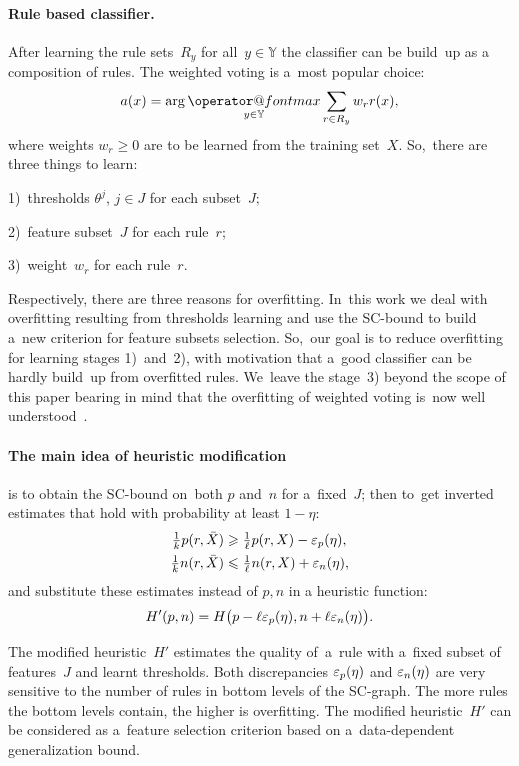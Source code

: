 \documentclass{article}
\makeatletter
\let\cite\citep
\def\YY{\mathbb{Y}}
\newcommand{\X}{\bar X}
\renewcommand{\geq}{\geqslant}
\renewcommand{\leq}{\leqslant}
\renewcommand{\max}{\mathop{\operator@font max}\limits}
\makeatother
\begin{document}
\paragraph{Rule based classifier.}
After learning the rule sets~$R_y$ for all~$y\in\YY$
the classifier can be build~up as a composition of rules.
The weighted voting is a~most popular choice:
\[
    a(x) = \arg\max_{y\in \YY} \sum_{r\in R_y} w_r r(x),
\]
where weights $w_r \geq 0$ are to be learned from the training set~$X$.
So,~there are three things to learn:

1)~thresholds $\theta^j$,\: $j\in J$  for each subset~$J$;\;

2)~feature subset~$J$  for each rule~$r$;\;

3)~weight~$w_r$  for each rule~$r$.

Respectively, there are three reasons for overfitting.
In~this work we deal with overfitting resulting from thresholds learning
and use the SC-bound to build a~new criterion for feature subsets selection.
So,~our goal is to reduce overfitting for learning stages 1)~and~2),
with motivation that a~good classifier can be hardly build~up from overfitted rules.
We~leave the stage~3) beyond the scope of this paper
bearing in mind that the overfitting of weighted voting
is~now well understood~\cite{schapire97boosting,koltchinskii01further}.

\paragraph{The main idea of heuristic modification}
is to obtain the SC-bound on~both $p$ and~$n$ for a~fixed~$J$;
then to~get inverted estimates that hold with probability at least $1-\eta$:
\begin{align*}
    \tfrac 1k p(r,\X) & \geq \tfrac 1\ell p(r,X) - \eps_p(\eta),\\
    \tfrac 1k n(r,\X) & \leq \tfrac 1\ell n(r,X) + \eps_n(\eta),
\end{align*}
and substitute these estimates instead of $p,n$ in a heuristic function:
\[
    H'(p,n) =
    H \bigl(
        p - \ell \varepsilon_p(\eta) ,
        n + \ell \varepsilon_n(\eta)
    \bigr).
\]

The modified heuristic~$H'$ estimates the quality of~a~rule
with a~fixed subset of features~$J$ and learnt thresholds.
Both discrepancies $\varepsilon_p(\eta)$ and $\varepsilon_n(\eta)$
are very sensitive to the number of rules in bottom levels of the SC-graph.
The more rules the bottom levels contain, the higher is overfitting.
The modified heuristic~$H'$ can be considered
as a~feature selection criterion based on a~data-dependent generalization bound.
\end{document}
